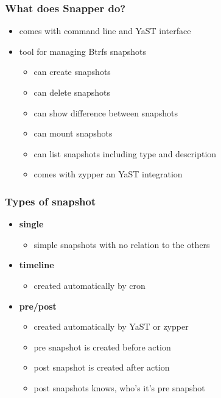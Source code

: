 \documentclass{beamer}
\begin{document}

\begin{frame}[t]
\frametitle{What does Snapper do?}
\begin{itemize}
   \item comes with command line and YaST interface
   \item tool for managing Btrfs snapshots
   \begin{itemize}
      \item can create snapshots
      \item can delete snapshots
      \item can show difference between snapshots
      \item can mount snapshots
      \item can list snapshots including type and description
      \item comes with zypper an YaST integration
   \end{itemize}
\end{itemize}
\end{frame}

\begin{frame}[t]
\frametitle{Types of snapshot}
\begin{itemize}
   \item \textbf{single}
   \begin{itemize}
      \item simple snapshots with no relation to the others
   \end{itemize}
   \item \textbf{timeline}
   \begin{itemize}
      \item created automatically by cron
   \end{itemize}
   \item \textbf{pre/post}
   \begin{itemize}
      \item created automatically by YaST or zypper
      \item pre snapshot is created before action
      \item post snapshot is created after action
      \item post snapshots knows, who's it's pre snapshot
   \end{itemize}
\end{itemize}
\end{frame}
\end{document}
